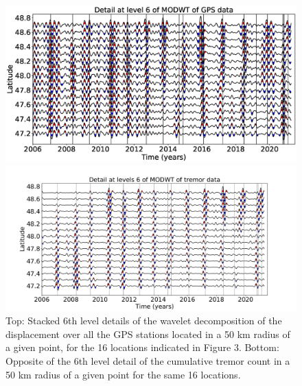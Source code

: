 \documentclass{article}
\begin{document}
\begin{figure}
\noindent\includegraphics[width=\textwidth, trim={0cm 0cm 0cm 0cm},clip]{figures/GPS_longer_detail_6.eps}

\noindent\includegraphics[width=\textwidth, trim={0cm 0cm 0cm 0cm},clip]{figures/tremor_longer_detail_6.pdf}
\caption{Top: Stacked 6th level details of the wavelet decomposition of the displacement over all the GPS stations located in a 50 km radius of a given point, for the 16 locations indicated in Figure 3. Bottom: Opposite of the 6th level detail of the cumulative tremor count in a 50 km radius of a given point for the same 16 locations.}
\label{pngfiguresample}
\end{figure}
\end{document}
